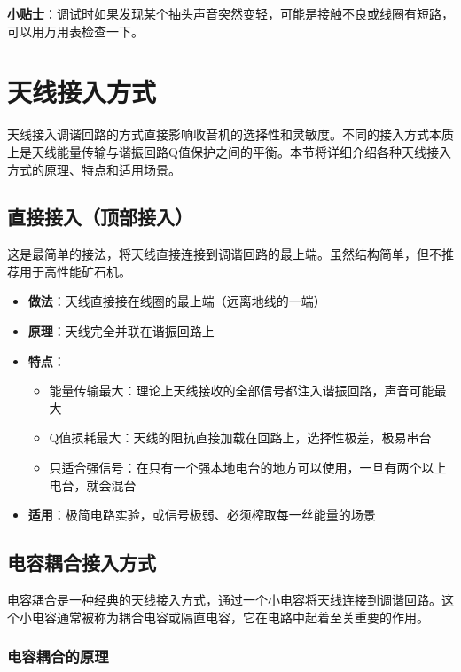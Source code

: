 \documentclass[12pt,UTF8]{ctexbook}
\begin{document}
\textbf{小贴士}：调试时如果发现某个抽头声音突然变轻，可能是接触不良或线圈有短路，可以用万用表检查一下。

\section{天线接入方式}

天线接入调谐回路的方式直接影响收音机的选择性和灵敏度。不同的接入方式本质上是天线能量传输与谐振回路Q值保护之间的平衡。本节将详细介绍各种天线接入方式的原理、特点和适用场景。

\subsection{直接接入（顶部接入）}

这是最简单的接法，将天线直接连接到调谐回路的最上端。虽然结构简单，但不推荐用于高性能矿石机。

\begin{itemize}[leftmargin=3.5em]
	\item \textbf{做法}：天线直接接在线圈的最上端（远离地线的一端）
	\item \textbf{原理}：天线完全并联在谐振回路上
	\item \textbf{特点}：
	\begin{itemize}[leftmargin=3.5em]
		\item 能量传输最大：理论上天线接收的全部信号都注入谐振回路，声音可能最大
		\item Q值损耗最大：天线的阻抗直接加载在回路上，选择性极差，极易串台
		\item 只适合强信号：在只有一个强本地电台的地方可以使用，一旦有两个以上电台，就会混台
	\end{itemize}
	\item \textbf{适用}：极简电路实验，或信号极弱、必须榨取每一丝能量的场景
\end{itemize}

\subsection{电容耦合接入方式}

电容耦合是一种经典的天线接入方式，通过一个小电容将天线连接到调谐回路。这个小电容通常被称为耦合电容或隔直电容，它在电路中起着至关重要的作用。

\subsubsection{电容耦合的原理}
\end{document}
